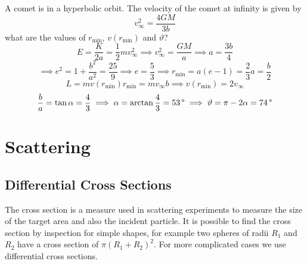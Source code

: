 \documentclass{article}
\begin{document}
    \example
    A comet is in a hyperbolic orbit.
    The velocity of the comet at infinity is given by
    \[v_\infty^2 = \frac{4GM}{3b}\]
    what are the values of \(r_\text{min}\), \(v(r_\text{min})\) and \(\vartheta\)?
    \[E = \frac{K}{2a} = \frac{1}{2}mv_\infty^2\implies v_\infty^2 = \frac{GM}{a}\implies a = \frac{3b}{4}\]
    \[\implies e^2 = 1 + \frac{b^2}{a^2} = \frac{25}{9} \implies e = \frac{5}{3} \implies r_\text{min} = a(e - 1) = \frac{2}{3}a = \frac{b}{2}\]
    \[L = mv(r_\text{min})r_\text{min} = mv_\infty b \implies v(r_\text{min}) = 2v_\infty\]
    \[\frac{b}{a} = \tan\alpha = \frac{4}{3}\implies \alpha = \arctan\frac{4}{3} = \SI{53}{\SIUnitSymbolDegree} \implies \vartheta = \pi - 2\alpha = \SI{74}{\SIUnitSymbolDegree}\]
    
    \section{Scattering}
    \subsection{Differential Cross Sections}\label{sec:diff cross sec}
    The cross section is a measure used in scattering experiments to measure the size of the target area and also the incident particle.
    It is possible to find the cross section by inspection for simple shapes, for example two spheres of radii \(R_1\) and \(R_2\) have a cross section of \(\pi(R_1 + R_2)^2\).
    For more complicated cases we use differential cross sections.
    
\end{document}
